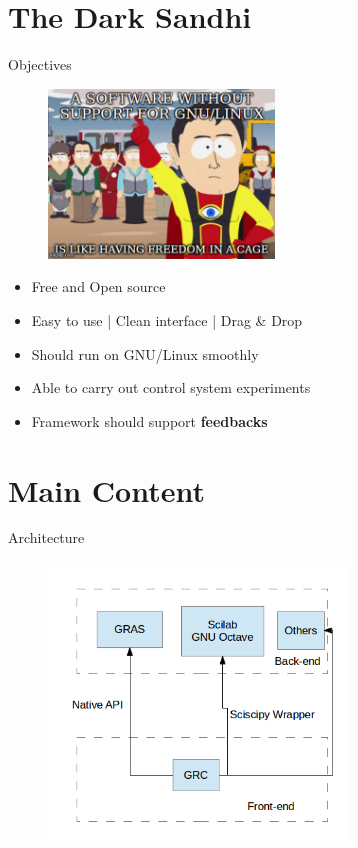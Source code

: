 \documentclass{beamer}
\begin{document}
\section{The Dark Sandhi}
\begin{frame}{Objectives}
\begin{figure} [ht!]
	\centering
	\includegraphics[width=60mm]{meme2.jpg}
\end{figure}

\begin{itemize}
  \item Free and Open source
  \item Easy to use | Clean interface | Drag \& Drop 
  \item Should run on GNU/Linux smoothly
  \item Able to carry out control system experiments
  \item Framework should support \textbf{feedbacks}
\end{itemize}
\vskip 1cm
\end{frame}

\section{Main Content}
\begin{frame}{Architecture}

\begin{figure} [ht!]
	\centering
	\includegraphics[width=80mm]{image.png}
\end{figure}
\vskip 1cm
\end{frame}
\end{document}
